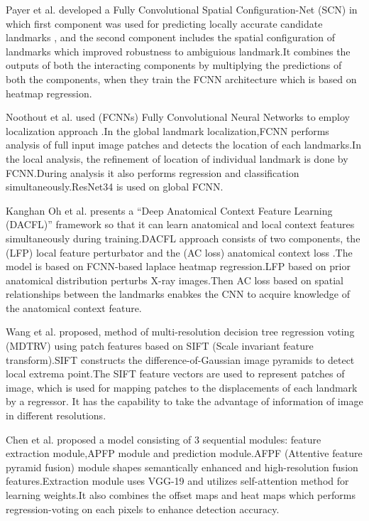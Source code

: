 \documentclass[sn-mathphys]{sn-jnl}%
\theoremstyle{thmstyleone}%
\theoremstyle{thmstyletwo}%
\theoremstyle{thmstylethree}%
\begin{document}
\par Payer et al.\cite{PAYER} developed a Fully Convolutional Spatial Configuration-Net (SCN) in which first component was used for predicting locally accurate candidate landmarks , and the second component includes the spatial configuration of landmarks which improved robustness to ambiguious landmark.It combines the outputs of both the interacting components by multiplying the predictions of both  the components, when they train the FCNN architecture which is based on heatmap regression.

\par Noothout et al.\cite{noothout2020deep} used (FCNNs) Fully Convolutional Neural Networks to employ localization approach .In the global landmark localization,FCNN performs analysis  of full input image patches and detects the location of each landmarks.In the local analysis, the refinement of location of individual landmark is done by FCNN.During analysis it also performs regression and classification simultaneously.ResNet34 is used on global FCNN.

\par Kanghan Oh et al. \cite{oh2020deep} presents a  “Deep Anatomical Context Feature Learning (DACFL)”  framework so that it can learn  anatomical and local context features simultaneously during training.DACFL approach consists of two components, the (LFP) local feature perturbator  and the (AC loss) anatomical context loss .The model is based on  FCNN-based laplace heatmap regression.LFP based on prior anatomical distribution perturbs X-ray images.Then AC loss based on spatial relationships between the landmarks enabkes the CNN to acquire knowledge of the anatomical context feature.

\par Wang et al.\cite{wang2018automatic} proposed, method of multi-resolution decision tree regression voting (MDTRV) using patch features based on SIFT (Scale invariant feature transform).SIFT constructs the difference-of-Gaussian image pyramids to detect local extrema point.The SIFT feature vectors  are used to represent patches of image, which is used for mapping patches to the displacements of each landmark by a regressor. It has the capability to take the advantage of information of image in different resolutions.

\par Chen et al. \cite{chen2019cephalometric}  proposed a model consisting of 3 sequential modules: feature extraction module,APFP module and prediction module.AFPF (Attentive feature pyramid fusion) module shapes  semantically enhanced and high-resolution fusion features.Extraction module uses VGG-19 and utilizes self-attention method for learning weights.It also combines the offset maps and heat maps which performs regression-voting on each pixels to enhance detection accuracy.  
\end{document}

